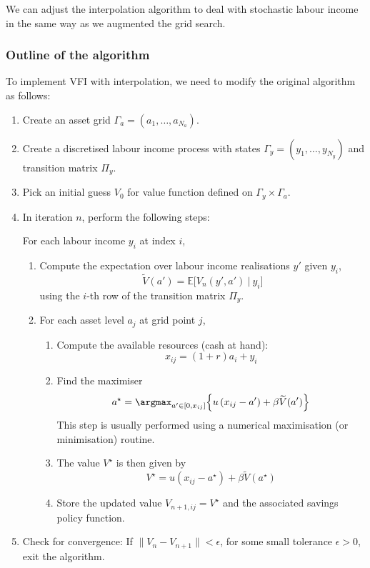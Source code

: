 \documentclass{scrartcl}
\providecommand{\tightlist}{%
      \setlength{\itemsep}{0pt}\setlength{\parskip}{0pt}}
\begin{document}
We can adjust the interpolation algorithm to deal with stochastic labour
income in the same way as we augmented the grid search.

\hypertarget{outline-of-the-algorithm}{%
\subsubsection*{Outline of the algorithm}\label{outline-of-the-algorithm}}

To implement VFI with interpolation, we need to modify the original
algorithm as follows:

\begin{enumerate}
\def\labelenumi{\arabic{enumi}.}
\item
  Create an asset grid \(\Gamma_a = (a_1, \dots, a_{N_a})\).
\item
  Create a discretised labour income process with states
  \(\Gamma_y = (y_1, \dots, y_{N_y})\) and transition matrix \(\Pi_y\).
\item
  Pick an initial guess \(V_0\) for value function defined on
  \(\Gamma_y \times \Gamma_a\).
\item
  In iteration \(n\), perform the following steps:

  For each labour income \(y_i\) at index \(i\),

  \begin{enumerate}
  \def\labelenumii{\arabic{enumii}.}
  \tightlist
  \item
    Compute the expectation over labour income realisations \(y'\) given
    \(y_i\),
    \[ \widetilde{V}(a') = \mathbb{E}\bigl[V_n(y',a')~|~y_i \bigr]\]
    using the \(i\)-th row of the transition matrix \(\Pi_y\).
  \item
    For each asset level \(a_j\) at grid point \(j\),

    \begin{enumerate}
    \def\labelenumiii{\arabic{enumiii}.}
    \tightlist
    \item
      Compute the available resources (cash at hand):
      \[x_{ij} = (1+r)a_i + y_i\]
    \item
      Find the maximiser
      \[a^{\star} = \argmax_{a' \in [0, x_{ij}]} \Bigl\{ u\left(x_{ij}-a'\right) + \beta \widetilde{V}(a') \Bigr\}\]
      This step is usually performed using a numerical maximisation (or
      minimisation) routine.
    \item
      The value \(V^{\star}\) is then given by
      \[V^{\star} = u\left(x_{ij}-a^{\star}\right) + \beta \widetilde{V}(a^{\star})\]
    \item
      Store the updated value \(V_{n+1,ij} = V^{\star}\) and the
      associated savings policy function.
    \end{enumerate}
  \end{enumerate}
\item
  Check for convergence: If \(\|V_n-V_{n+1}\| < \epsilon\), for some
  small tolerance \(\epsilon > 0\), exit the algorithm.
\end{enumerate}
\end{document}
